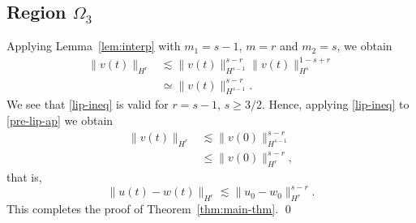 \documentclass[12pt,reqno]{amsart}
\numberwithin{equation}{section}  %
\numberwithin{figure}{section}
\begin{document}
\subsection{Region $\Omega_{3}$} 
\label{ssec:case-2}
%
%
Applying Lemma~\ref{lem:interp} with $m_{1} = s-1$, $m =r$ and $m_{2} = s$, 
we obtain
%
%
\begin{equation}
  \label{pre-lip-ap}
\begin{split}
  \| v(t) \|_{H^{r}} & \lesssim \| v(t) \|_{H^{s-1}}^{s-r} \|v(t) \|_{H^{s}}^{1-s+r}
  \\
  & \simeq \| v(t) \|_{H^{s-1}}^{s-r}.
\end{split}
\end{equation}
%
%
We see that \eqref{lip-ineq} is valid for  $r = s-1$, $s \ge 3/2$. Hence,
applying \eqref{lip-ineq} to \eqref{pre-lip-ap} we obtain 
%
%
\begin{equation*}
\begin{split}
  \| v(t) \|_{H^{r}} & \lesssim \|v(0) \|_{H^{s-1}}^{s-r}
   \\
   & \le \|v(0) \|_{H^{r}}^{s-r},
\end{split}
\end{equation*}
%
that is,
\begin{equation*}
  \| u(t) - w(t) \|_{H^{r}} \lesssim  \|u_{0} - w_{0}\|_{H^{r}}^{s-r}.
\end{equation*}
%
This completes the proof of Theorem~\ref{thm:main-thm}. \qed
%
%
\providecommand{\bysame}{\leavevmode\hbox to3em{\hrulefill}\thinspace}
\providecommand{\MR}{\relax\ifhmode\unskip\space\fi MR }
\providecommand{\MRhref}[2]{%
  \href{http://www.ams.org/mathscinet-getitem?mr=#1}{#2}
}
\providecommand{\href}[2]{#2}
\end{document}
